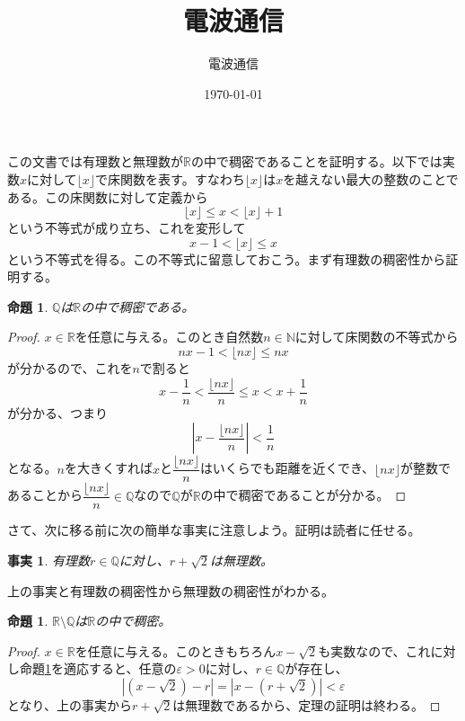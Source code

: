 \documentclass[leqno]{jsarticle}
\title{電波通信}
\author{電波通信}
\date{\today}
\newtheorem{prop}[thm]{命題}
\newtheorem{fact}[thm]{事実}
\newcommand{\nn}{\mathbb{N}}
\newcommand{\qq}{\mathbb{Q}}
\newcommand{\rr}{\mathbb{R}}
\newcommand{\ep}{\varepsilon}
\begin{document}
\maketitle
この文書では有理数と無理数が$\rr$の中で稠密であることを証明する。以下では実数$x$に対して$\lfloor x \rfloor$で床関数を表す。すなわち$\lfloor x \rfloor$は$x$を越えない最大の整数のことである。この床関数に対して定義から
\[
\lfloor x\rfloor \le x<\lfloor x\rfloor+1
\]
という不等式が成り立ち、これを変形して
\[
x-1<\lfloor x\rfloor\le x
\]
という不等式を得る。この不等式に留意しておこう。まず有理数の稠密性から証明する。
\begin{prop}\label{1}
$\qq$は$\rr$の中で稠密である。
\end{prop}
\begin{proof}
$x\in \rr$を任意に与える。このとき自然数$n\in \nn$に対して床関数の不等式から
\[
nx-1<\lfloor nx\rfloor\le nx
\]
が分かるので、これを$n$で割ると
\[
x-\frac{1}{n}<\frac{\lfloor nx\rfloor}{n}\le x<x+\frac{1}{n}
\]
が分かる、つまり
\[
\left|x-\frac{\lfloor nx\rfloor}{n}\right|<\frac{1}{n}
\]
となる。$n$を大きくすれば$x$と$\dfrac{\lfloor nx\rfloor}{n}$はいくらでも距離を近くでき、$\lfloor nx\rfloor$が整数であることから$\dfrac{\lfloor nx\rfloor}{n}\in \qq$なので$\qq$が$\rr$の中で稠密であることが分かる。
\end{proof}

さて、次に移る前に次の簡単な事実に注意しよう。証明は読者に任せる。
\begin{fact}
有理数$r\in \qq$に対し、$r+\sqrt{2}$は無理数。
\end{fact}

上の事実と有理数の稠密性から無理数の稠密性がわかる。
\begin{prop}
$\rr\setminus \qq$は$\rr$の中で稠密。
\end{prop}
\begin{proof}
$x\in \rr$を任意に与える。このときもちろん$x-\sqrt{2}$も実数なので、これに対し命題\ref{1}を適応すると、任意の$\ep>0$に対し、$r\in \qq$が存在し、
\[
|(x-\sqrt{2})-r|=|x-(r+\sqrt{2})|<\ep
\]
となり、上の事実から$r+\sqrt{2}$は無理数であるから、定理の証明は終わる。
\end{proof}
















































			
\end{document}
